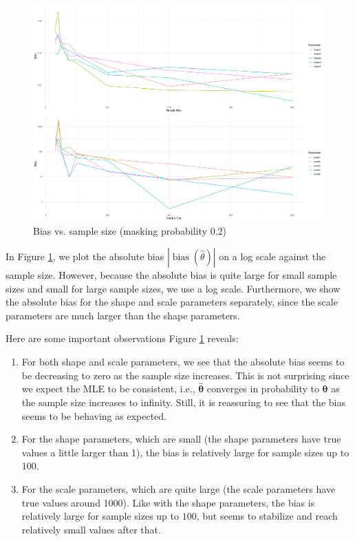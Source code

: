 \documentclass[
]{article}
\begin{document}
\begin{figure}

{\centering \includegraphics{image/plot-p-0.2-bias-vs-sample-size} 

}

\caption{Bias vs. sample size (masking probability 0.2)}\label{fig:plot-bias-p-0.2-vs-sample-size}
\end{figure}

In Figure \ref{fig:plot-bias-p-0.2-vs-sample-size}, we plot the absolute
bias \(|\operatorname{bias}(\hat\theta)|\) on a log scale against the
sample size. However, because the absolute bias is quite large for small
sample sizes and small for large sample sizes, we use a log scale.
Furthermore, we show the absolute bias for the shape and scale
parameters separately, since the scale parameters are much larger than
the shape parameters.

Here are some important observations Figure
\ref{fig:plot-bias-p-0.2-vs-sample-size} reveals:

\begin{enumerate}
\def\labelenumi{\arabic{enumi}.}
\item
  For both shape and scale parameters, we see that the absolute bias
  seems to be decreasing to zero as the sample size increases. This is
  not surprising since we expect the MLE to be consistent, i.e.,
  \(\boldsymbol{\hat\theta}\) converges in probability to
  \(\boldsymbol{\theta}\) as the sample size increases to infinity.
  Still, it is reassuring to see that the bias seems to be behaving as
  expected.
\item
  For the shape parameters, which are small (the shape parameters have
  true values a little larger than 1), the bias is relatively large for
  sample sizes up to \(100\).
\item
  For the scale parameters, which are quite large (the scale parameters
  have true values around 1000). Like with the shape parameters, the
  bias is relatively large for sample sizes up to \(100\), but seems to
  stabilize and reach relatively small values after that.
\end{enumerate}
\end{document}
